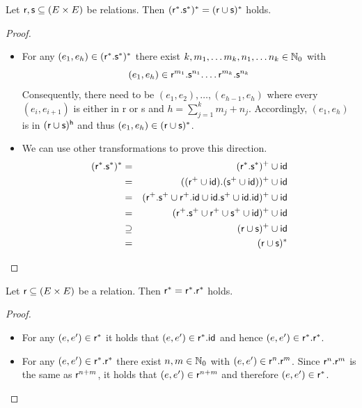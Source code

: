 \documentclass[a4paper,twoside,12pt, english]{article}
\begin{document}
\begin{lemma}\label{lem:*cup*}
Let $\textsf{\upshape r},\textsf{\upshape s} \subseteq (E\times E)$ be relations. Then $\sf (r^*.s^*)^* = (r \cup s)^*$ holds.
\end{lemma}
\begin{proof}
\begin{itemize}
\item[$\subseteq$:] For any $(e_1,e_h) \in \sf (r^*.s^*)^*$ there exist $k,m_1,\dots m_k,n_1,\dots n_k \in \mathbb{N}_0$ with \[(e_1,e_h) \in {\sf r}^{m_1}.{\sf s}^{n_1}. \dots {\sf r}^{m_k}.{\sf s}^{n_k}\]
Consequently, there need to be $(e_1,e_{2}),\dots ,(e_{h-1},e_{h})$ where every $(e_i,e_{i+1})$ is either in \textsf{r} or \textsf{s} and $h = \sum_{j=1}^k m_j + n_j$.
Accordingly, $(e_1,e_h)$ is in $\sf (r \cup s)^h$ and thus $(e_1,e_h) \in \sf (r \cup s)^*$.
\item[$\supseteq$:] We can use other transformations to prove this direction.
\begin{eqnarray*}
\sf (r^*.s^*)^* &=& \sf (r^*.s^*)^+ \cup \textsf{\upshape id} \\
&=& \sf ((r^+ \cup \textsf{\upshape id}).(s^+ \cup \textsf{\upshape id}))^+ \cup \textsf{\upshape id} \\
&=& \sf (r^+.s^+ \cup r^+.\textsf{\upshape id} \cup \textsf{\upshape id}.s^+ \cup \textsf{\upshape id}.\textsf{\upshape id})^+ \cup \textsf{\upshape id} \\
&=& \sf (r^+.s^+ \cup r^+ \cup s^+ \cup \textsf{\upshape id})^+ \cup \textsf{\upshape id} \\
&\supseteq & \sf (r \cup s)^+ \cup \textsf{\upshape id} \\
&=& \sf (r \cup s)^*
\end{eqnarray*}
\end{itemize}
\end{proof}


\begin{lemma}\label{lem:*.*}
Let $\textsf{\upshape r} \subseteq (E\times E)$ be a relation. Then $\sf r^* = r^*.r^*$ holds. \end{lemma}
\begin{proof}
\begin{itemize}
\item[$\subseteq$:] For any $(e,e') \in \sf r^*$ it holds that $(e,e') \in \sf r^*.\textsf{\upshape id}$ and hence $(e,e') \in \sf r^*.r^*$. \\
\item[$\supseteq$:] For any $(e,e') \in \sf r^*.r^*$ there exist $n,m \in \mathbb{N}_0$ with $(e,e') \in {\sf r}^n.\textsf{\upshape r}^m$. Since ${\sf r}^n.\textsf{\upshape r}^m$ is the same as $\textsf{\upshape r}^{n+m}$, it holds that $(e,e') \in {\sf r}^{n+m}$ and therefore $(e,e') \in {\sf r}^*$.
\end{itemize}
\end{proof}
\end{document}
